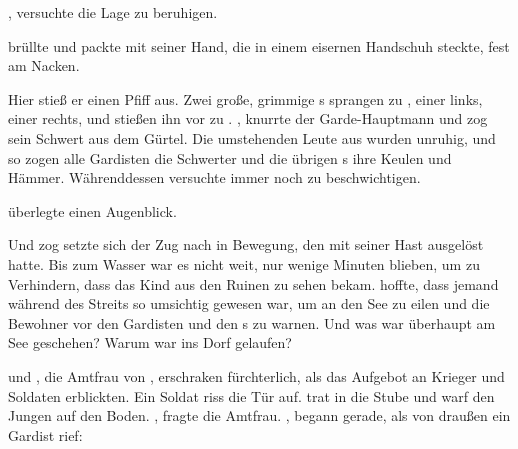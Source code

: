 \begin{Large}
, versuchte {\Nox} die Lage zu beruhigen. 

 brüllte {\BalasarSpaltfuss} und packte mit seiner Hand, die in einem eisernen Handschuh steckte, {\Piedo} fest am Nacken. 

Hier stieß er einen Pfiff aus. Zwei große, grimmige {\Bangiri}s sprangen zu {\Nox}, einer links, einer rechts, und stießen ihn vor zu {\Spaltfuss}. , knurrte der Garde-Hauptmann und zog sein Schwert aus dem Gürtel. Die umstehenden Leute aus {\Berna} wurden unruhig, und so zogen alle Gardisten die Schwerter und die übrigen {\Bangiri}s ihre Keulen und Hämmer. Währenddessen versuchte {\Nox} immer noch zu beschwichtigen. 

{\Spaltfuss} überlegte einen Augenblick.\\

Und zog setzte sich der Zug nach {\AltBerna} in Bewegung, den {\Piedo} mit seiner Hast ausgelöst hatte. Bis zum Wasser war es nicht weit, nur wenige Minuten blieben, um zu Verhindern, dass {\BalasarSpaltfuss} das Kind aus den Ruinen zu sehen bekam. {\Nox} hoffte, dass jemand während des Streits so umsichtig gewesen war, um an den See zu eilen und die Bewohner vor den Gardisten und den {\Bangiri}s zu warnen. Und was war überhaupt am See geschehen? Warum war {\Piedo} ins Dorf gelaufen?

{\Marn} und {\Tea}, die Amtfrau von {\AltBerna}, erschraken fürchterlich, als das Aufgebot an Krieger und Soldaten erblickten. Ein Soldat riss die Tür auf. {\Spaltfuss} trat in die Stube und warf den Jungen auf den Boden. , fragte {\Spaltfuss} die Amtfrau. , begann {\Tea} gerade, als von draußen ein Gardist rief: 


\end{Large}
